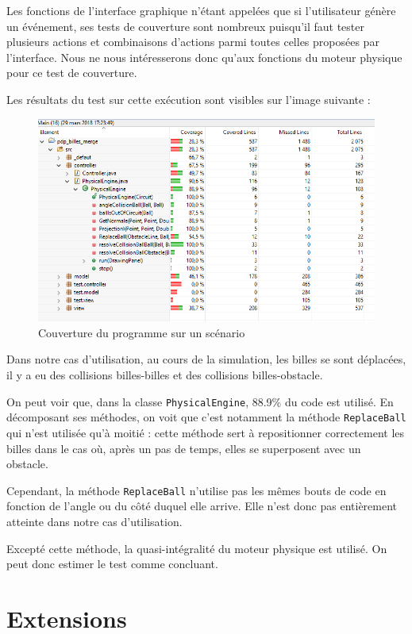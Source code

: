 \documentclass{report}
\begin{document}
Les fonctions de l’interface graphique n’étant appelées que si l’utilisateur génère un événement, ses tests de couverture sont nombreux puisqu’il faut tester plusieurs actions et combinaisons d’actions parmi toutes celles proposées par l’interface. 
Nous ne nous intéresserons donc qu’aux fonctions du moteur physique pour ce test de couverture.

\newpage
Les résultats du test sur cette exécution sont visibles sur l’image suivante :

\begin{figure}[H]
\centering
\includegraphics[scale=0.8]{coverage.png}
\caption{Couverture du programme sur un scénario}
\end{figure}

Dans notre cas d’utilisation, au cours de la simulation, les billes se sont déplacées, il y a eu des collisions billes-billes et des collisions billes-obstacle.

On peut voir que, dans la classe \texttt{PhysicalEngine}, 88.9\% du code est utilisé. En décomposant ses méthodes, on voit que c’est notamment la méthode \texttt{ReplaceBall} qui n’est utilisée qu’à moitié : cette méthode sert à repositionner correctement les billes dans le cas où, après un pas de temps, elles se superposent avec un obstacle.

Cependant, la méthode \texttt{ReplaceBall} n’utilise pas les mêmes bouts de code en fonction de l’angle ou du côté duquel elle arrive. Elle n’est donc pas entièrement atteinte dans notre cas d’utilisation.

Excepté cette méthode, la quasi-intégralité du moteur physique est utilisé. On peut donc estimer le test comme concluant.


\chapter{Extensions}
\end{document}

